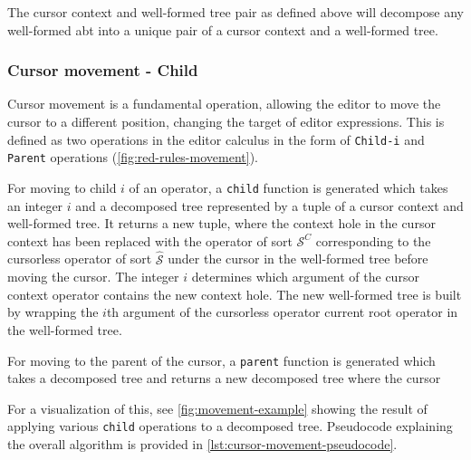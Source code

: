 The cursor context and well-formed tree pair as defined above will decompose
any well-formed abt into a unique pair of a cursor context and a well-formed tree.


\subsubsection{Cursor movement - Child}
Cursor movement is a fundamental operation, allowing the editor to move the cursor
to a different position, changing the target of editor expressions. This is defined
as two operations in the editor calculus in the form of
\texttt{Child-i} and \texttt{Parent} operations (\cref{fig:red-rules-movement}).

For moving to child $i$ of an operator, a \texttt{child} function is generated
which takes an integer $i$ and a decomposed tree represented by a tuple of a cursor
context and well-formed tree. It returns a new tuple, where the context hole in
the cursor context has been replaced with the operator of sort $\mathcal{S}^C$ corresponding to the cursorless
operator of sort $\hat{\mathcal{S}}$ under the cursor in the well-formed tree before
moving the cursor. The integer $i$ determines which argument of the cursor context
operator contains the new context hole. The new well-formed tree is built by
wrapping the $i$th argument of the cursorless operator current root operator
in the well-formed tree.

For moving to the parent of the cursor, a \texttt{parent} function is generated
which takes a decomposed tree and returns a new decomposed tree where the cursor

For a visualization of this, see \cref{fig:movement-example} showing the result
of applying various \texttt{child} operations to a decomposed tree.
Pseudocode explaining the overall algorithm is provided in
\cref{lst:cursor-movement-pseudocode}.

